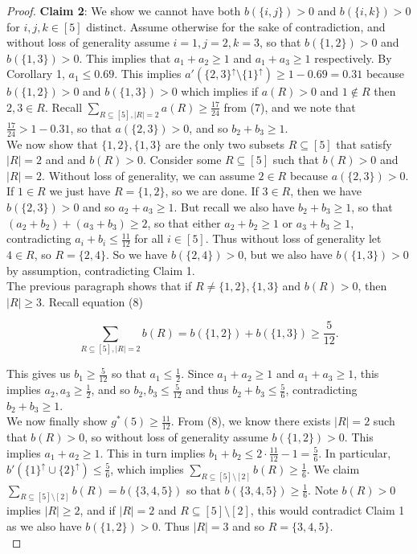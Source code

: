 \documentclass{article}
\begin{document}
\begin{proof}
\textbf{Claim 2}: We show we cannot have both $b(\{i,j\}) > 0$ and $b(\{i,k\}) > 0$ for $i,j,k \in [5]$ distinct. Assume otherwise for the sake of contradiction, and without loss of generality assume $i=1,j=2,k=3$, so that $b(\{1,2\}) > 0$ and $b(\{1,3\}) > 0$. This implies that $a_1 + a_2 \geq 1$ and $a_1 + a_3 \geq 1$ respectively. By Corollary 1, $a_1 \leq 0.69$. This implies $a'(\{2,3\}^{\uparrow} \setminus \{1\}^{\uparrow}) \geq 1-0.69 = 0.31$ because $b(\{1,2\}) > 0$ and $b(\{1,3\}) > 0$ which implies if $a(R) > 0$ and $1 \not \in R$ then $2,3 \in R$. Recall $\sum_{R \subseteq [5], |R| = 2} a(R) \geq \frac{17}{24}$ from (7), and we note that $\frac{17}{24} > 1 - 0.31$, so that $a(\{2,3\}) > 0$, and so $b_2 + b_3 \geq 1$. \\

We now show that $\{1,2\}, \{1,3\}$ are the only two subsets $R \subseteq [5]$ that satisfy $|R| = 2$ and and $b(R) > 0$. Consider some $R \subseteq [5]$ such that $b(R) > 0$ and $|R| = 2$. Without loss of generality, we can assume $2 \in R$ because $a(\{2,3\}) > 0$. If $1 \in R$ we just have $R = \{1,2\}$, so we are done. If $3 \in R$, then we have $b(\{2,3\}) > 0$ and so $a_2 + a_3 \geq 1$. But recall we also have $b_2 + b_3 \geq 1$, so that $(a_2 + b_2) + (a_3 + b_3) \geq 2$, so that either $a_2 + b_2 \geq 1$ or $a_3 + b_3 \geq 1$, contradicting $a_i + b_i \leq \frac{11}{12}$ for all $i \in [5]$. Thus without loss of generality let $4 \in R$, so $R =  \{2,4\}$. So we have $b(\{2,4\}) > 0$, but we also have $b(\{1,3\}) > 0$ by assumption, contradicting Claim 1. \\

The previous paragraph shows that if $R \neq \{1,2\}, \{1,3\}$ and $b(R) > 0$, then $|R| \geq 3$. Recall equation (8)

$$\sum_{R \subseteq [5], |R| = 2} b(R) = b(\{1,2\}) + b(\{1,3\}) \geq \frac{5}{12}.$$

\noindent
This gives us $b_1 \geq \frac{5}{12}$ so that $a_1 \leq \frac{1}{2}$. Since $a_1 + a_2 \geq 1$ and $a_1 + a_3 \geq 1$, this implies $a_2,a_3 \geq \frac{1}{2}$, and so $b_2,b_3 \leq \frac{5}{12}$ and thus $b_2 + b_3 \leq \frac{5}{6}$, contradicting $b_2 + b_3 \geq 1$. \\

We now finally show $g^*(5) \geq \frac{11}{12}$. From (8), we know there exists $|R| = 2$ such that $b(R) > 0$, so without loss of generality assume $b(\{1,2\}) > 0 $. This implies $a_1 + a_2 \geq 1$. This in turn implies $b_1 + b_2 \leq 2 \cdot \frac{11}{12} - 1 = \frac{5}{6}$. In particular, $b'(\{1\}^{\uparrow} \cup \{2\}^{\uparrow}) \leq \frac{5}{6}$, which implies $\sum_{R \subseteq [5] \setminus [2]} b(R) \geq \frac{1}{6}$. We claim $\sum_{R \subseteq [5] \setminus [2]} b(R) = b(\{3,4,5\})$ so that $b(\{3,4,5\}) \geq \frac{1}{6}$. Note $b(R) > 0$ implies $|R| \geq 2$, and if $|R| = 2$ and $R \subseteq [5] \setminus [2]$, this would contradict Claim 1 as we also have $b(\{1,2\}) > 0$. Thus $|R| = 3$ and so $R = \{3,4,5\}$.  \\


\end{proof}
\end{document}
